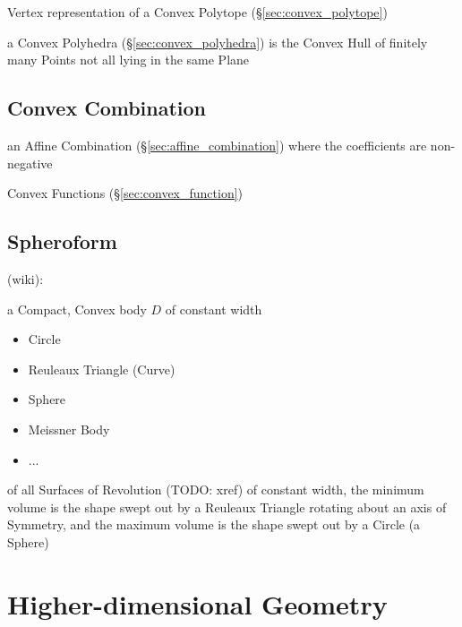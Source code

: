 Vertex representation of a Convex Polytope (\S\ref{sec:convex_polytope})

a Convex Polyhedra (\S\ref{sec:convex_polyhedra}) is the Convex Hull of
finitely many Points not all lying in the same Plane



\subsection{Convex Combination}\label{sec:convex_combination}

an Affine Combination (\S\ref{sec:affine_combination}) where the coefficients
are non-negative

\fist Convex Functions (\S\ref{sec:convex_function})



\subsection{Spheroform}\label{sec:spheroform}

(wiki):

a Compact, Convex body $D$ of constant width

\begin{itemize}
  \item Circle
  \item Reuleaux Triangle (Curve)
  \item Sphere
  \item Meissner Body
  \item ...
\end{itemize}

of all Surfaces of Revolution (TODO: xref) of constant width, the minimum volume
is the shape swept out by a Reuleaux Triangle rotating about an axis of
Symmetry, and the maximum volume is the shape swept out by a Circle (a Sphere)



\section{Higher-dimensional Geometry}\label{sec:higher_geometry}


